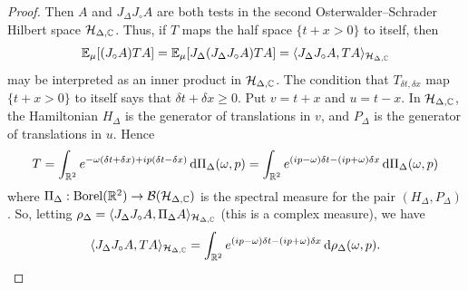 \begin{proof}
    Then $A$ and $J_\Delta J_\circ A$ are both tests in the  second Osterwalder--Schrader Hilbert space $\mathcal{H}_{\Delta,\mathbb{C}}$. Thus, if $T$ maps the half space $\{t+x>0\}$ to itself, then
    \begin{equation}
        \mathbb{E}_\mu[(J_\circ A)T A ] =\mathbb{E}_\mu[J_\Delta (J_\Delta J_\circ A)T A ] = \langle J_\Delta J_\circ A,TA \rangle_{\mathcal{H}_{\Delta,\mathbb{C}}}
    \end{equation}
    may be interpreted as an inner product in $\mathcal{H}_{\Delta,\mathbb{C}}$. 
    The condition that $T_{\delta t,\delta x}$ map $\{t+x>0\}$ to itself says that $\delta t+\delta x\geq0$. Put $v=t+x$ and $u=t-x$.
    In $\mathcal{H}_{\Delta,\mathbb{C}}$, the Hamiltonian $H_\Delta$ is the generator of translations in $v$, and $P_\Delta$ is the generator of translations in $u$. Hence 
    \begin{equation}
        T = \int_{\mathbb{R}^2} e^{- \omega (\delta t+\delta x) + i p (\delta t-\delta x)} \,\mathrm{d} \Pi_\Delta(\omega,p) = \int_{\mathbb{R}^2} e^{ (ip-\omega) \delta t - (ip+\omega) \delta x} \,\mathrm{d} \Pi_\Delta(\omega ,p) 
    \end{equation}
    where $\Pi_\Delta:\operatorname{Borel}(\mathbb{R}^2)\to \mathcal{B}(\mathcal{H}_{\Delta,\mathbb{C}})$ is the spectral measure for the pair $(H_\Delta,P_\Delta)$. So, letting $\rho_\Delta = \langle J_\Delta J_\circ A, \Pi_\Delta A \rangle_{\mathcal{H}_{\Delta,\mathbb{C}}}$
    (this is a complex measure), we have 
    \begin{equation}
        \langle J_\Delta J_\circ A,TA \rangle_{\mathcal{H}_{\Delta,\mathbb{C}}} = \int_{\mathbb{R}^2} e^{(ip-\omega) \delta t - (ip+\omega) \delta x} \,\mathrm{d} \rho_\Delta(\omega,p)  .
    \end{equation}


\end{proof}
